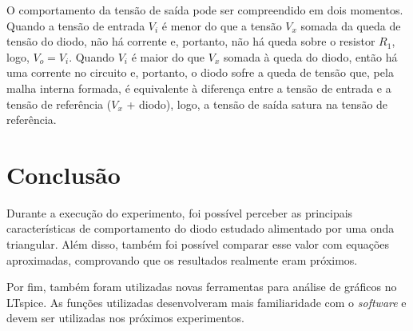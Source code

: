 \documentclass[a4paper]{report}
\begin{document}
O comportamento da tensão de saída pode ser compreendido em dois momentos. Quando a tensão de entrada $V_i$ é menor do que a tensão $V_x$ somada da queda de tensão do diodo, não há corrente e, portanto, não há queda sobre o resistor $R_1$, logo, $V_o = V_i$. Quando $V_i$ é maior do que $V_x$ somada à queda do diodo, então há uma corrente no circuito e, portanto, o diodo sofre a queda de tensão que, pela malha interna formada, é equivalente à diferença entre a tensão de entrada e a tensão de referência ($V_x$ + diodo), logo, a tensão de saída satura na tensão de referência.

\section*{Conclusão}

Durante a execução do experimento, foi possível perceber as principais características de comportamento do diodo estudado alimentado por uma onda triangular. Além disso, também foi possível comparar esse valor com equações aproximadas, comprovando que os resultados realmente eram próximos.

Por fim, também foram utilizadas novas ferramentas para análise de gráficos no LTspice. As funções utilizadas desenvolveram mais familiaridade com o \textit{software} e devem ser utilizadas nos próximos experimentos.
\end{document}
